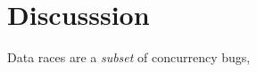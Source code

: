 \section{Discusssion}
\label{s:discussion}

%
Data races are a \textit{subset} of concurrency bugs, 

%

